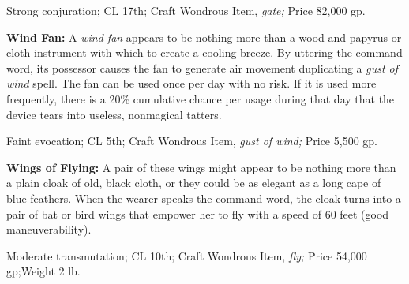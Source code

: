 Strong conjuration; CL 17th; Craft Wondrous Item, \textit{gate; }Price 82,000 gp.

\textbf{Wind Fan:} A \textit{wind fan }appears to be nothing more than a wood and 
papyrus or cloth instrument with which to create a cooling breeze. By uttering 
the command word, its possessor causes the fan to generate air movement duplicating 
a \textit{gust of wind }spell. The fan can be used once per day with no risk. If 
it is used more frequently, there is a 20\% cumulative chance per usage during 
that day that the device tears into useless, nonmagical tatters.

Faint evocation; CL 5th; Craft Wondrous Item, \textit{gust of wind; }Price 5,500 
gp.

\textbf{Wings of Flying:} A pair of these wings might appear to be nothing more 
than a plain cloak of old, black cloth, or they could be as elegant as a long cape 
of blue feathers. When the wearer speaks the command word, the cloak turns into 
a pair of bat or bird wings that empower her to fly with a speed of 60 feet (good 
maneuverability).

Moderate transmutation; CL 10th; Craft Wondrous Item, \textit{fly; }Price 54,000 
gp;Weight 2 lb.
